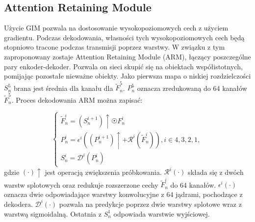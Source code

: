 \documentclass[a4paper,12pt,twoside,openany]{report}
\begin{document}
\subsection{Attention Retaining Module}

Użycie GIM pozwala na dostosowanie wysokopoziomowych cech z użyciem gradientu. Podczas dekodowania, własności tych wysokopoziomowych cech będą stopniowo tracone podczas transmisji poprzez warstwy. W związku z tym zaproponowany zostaje Attention Retaining Module (ARM), łączący poszczególne pary enkoder-dekoder. Pozwala on sieci skupić się na obiektach współistotnych, pomijając pozostałe nieważne obiekty. Jako pierwsza mapa o niskiej rozdzielczości $S_n^5$ brana jest średnia dla kanału dla $\tilde F_n^5$. $P_n^5$ oznacza zredukowaną do 64 kanałów $\tilde F_n^5$. Proces dekodowania ARM można zapisać:

\begin{equation}
\begin{cases}
	\tilde F_n^i = (S_n^{i+1}) \uparrow \astrosun F_n^i \\
	P_n^i = \epsilon^i \left(\left(P_n^{i+1}\right)\uparrow+\mathcal{R}^i\left(\tilde F_n^i\right)\right), i \in {4, 3, 2, 1}, \\
	S_n^i = \mathcal{D}^i (P^i_n)
\end{cases}
\end{equation}
gdzie $(\cdot)\uparrow$ jest operacją zwiększenia próbkowania. $\mathcal{R}^i\left(\cdot\right)$ składa się z dwóch warstw splotowych oraz redukuje rozszerzone cechy $\tilde F_n^i$ do 64 kanałów. $\epsilon^i(\cdot)$ oznacza dwie odpowiadające warstwy konwolucyjne z 64 jądrami, pochodzące z dekodera. $\mathcal{D}^i(\cdot)$ pozwala na predykcje poprzez dwie warstwy splotowe wraz z warstwą sigmoidalną. Ostatnia z $S^1_n$ odpowiada warstwie wyjściowej.
\end{document}
